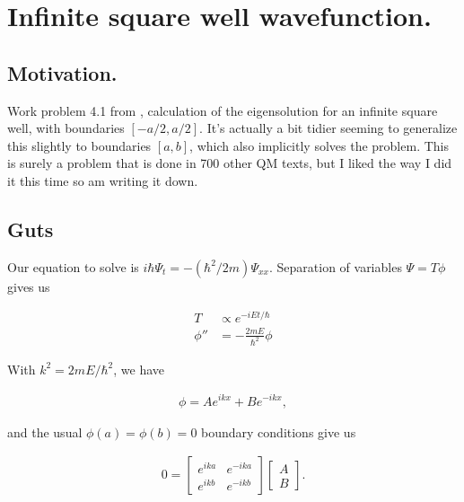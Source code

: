%
%

\chapter{Infinite square well wavefunction.}
\label{chap:liboff41}
{}
\date{May 31, 2010}

\beginArtNoToc

\section{Motivation.}

Work problem 4.1 from \citep{liboff2003iqm}, calculation of the eigensolution for an infinite square well, with boundaries $[-a/2, a/2]$.  It's actually a bit tidier seeming to generalize this slightly to boundaries $[a,b]$, which also implicitly solves the problem.  This is surely a problem that is done in 700 other QM texts, but I liked the way I did it this time so am writing it down.

\section{Guts}

Our equation to solve is $i \hbar \Psi_t = -(\hbar^2/2m) \Psi_{xx}$.  Separation of variables $\Psi = T \phi$ gives us

\begin{align}\label{eqn:liboff41:1}
T &\propto e^{-i E t/\hbar } \\
\phi'' &= -\frac{2 m E }{\hbar^2} \phi
\end{align}

With $k^2 = 2 m E/\hbar^2$, we have

\begin{align}\label{eqn:liboff41:2}
\phi = A e^{i k x } + B e^{-i k x},
\end{align}

and the usual $\phi(a) = \phi(b) = 0$ boundary conditions give us

\begin{align}\label{eqn:liboff41:3}
0 = 
\begin{bmatrix}
e^{i k a } & e^{-i k a} \\
e^{i k b } & e^{-i k b}
\end{bmatrix}
\begin{bmatrix}
A \\
B
\end{bmatrix}.
\end{align}

